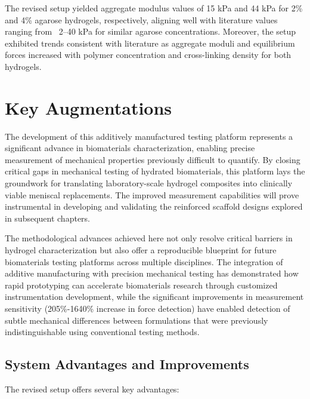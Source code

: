 The revised setup yielded aggregate modulus values of 15 kPa and 44 kPa for 2\% and 4\% agarose hydrogels, respectively, aligning well with literature values ranging from ~2--40 kPa for similar agarose concentrations\cite{buschmann1998mechanicalproperties}. Moreover, the setup exhibited trends consistent with literature as aggregate moduli and equilibrium forces increased with polymer concentration and cross-linking density for both hydrogels.

\section{Key Augmentations}

The development of this additively manufactured testing platform represents a significant advance in biomaterials characterization, enabling precise measurement of mechanical properties previously difficult to quantify. By closing critical gaps in mechanical testing of hydrated biomaterials, this platform lays the groundwork for translating laboratory-scale hydrogel composites into clinically viable meniscal replacements. The improved measurement capabilities will prove instrumental in developing and validating the reinforced scaffold designs explored in subsequent chapters.

The methodological advances achieved here not only resolve critical barriers in hydrogel characterization but also offer a reproducible blueprint for future biomaterials testing platforms across multiple disciplines. The integration of additive manufacturing with precision mechanical testing has demonstrated how rapid prototyping can accelerate biomaterials research through customized instrumentation development, while the significant improvements in measurement sensitivity (205\%-1640\% increase in force detection) have enabled detection of subtle mechanical differences between formulations that were previously indistinguishable using conventional testing methods.

\subsection{System Advantages and Improvements}

The revised setup offers several key advantages:

